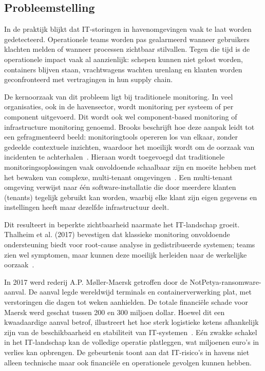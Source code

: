 \subsection{Probleemstelling}

In de praktijk blijkt dat IT-storingen in havenomgevingen vaak te laat worden gedetecteerd. Operationele teams worden pas gealarmeerd wanneer gebruikers klachten melden of wanneer processen zichtbaar stilvallen. Tegen die tijd is de operationele impact vaak al aanzienlijk: schepen kunnen niet gelost worden, containers blijven staan, vrachtwagens wachten urenlang en klanten worden geconfronteerd met vertragingen in hun supply chain.

De kernoorzaak van dit probleem ligt bij traditionele monitoring. In veel organisaties, ook in de havensector, wordt monitoring per systeem of per component uitgevoerd. Dit wordt ook wel component-based monitoring of infrastructure monitoring genoemd. Brooks beschrijft hoe deze aanpak leidt tot een gefragmenteerd beeld: monitoringtools opereren los van elkaar, zonder gedeelde contextuele inzichten, waardoor het moeilijk wordt om de oorzaak van incidenten te achterhalen~\autocite{Brooks2004}. Hieraan wordt toegevoegd dat traditionele monitoringsoplossingen vaak onvoldoende schaalbaar zijn en moeite hebben met het bewaken van complexe, multi-tenant omgevingen~\autocite{Andreolini2014}. Een multi-tenant omgeving verwijst naar één software-installatie die door meerdere klanten (tenants) tegelijk gebruikt kan worden, waarbij elke klant zijn eigen gegevens en instellingen heeft maar dezelfde infrastructuur deelt.

Dit resulteert in beperkte zichtbaarheid naarmate het IT-landschap groeit. Thalheim et al. (2017) bevestigen dat klassieke monitoring onvoldoende ondersteuning biedt voor root-cause analyse in gedistribueerde systemen; teams zien wel symptomen, maar kunnen deze moeilijk herleiden naar de werkelijke oorzaak~\autocite{Thalheim2017}.

In 2017 werd rederij A.P. Møller-Maersk getroffen door de NotPetya-ransomware-aanval. De aanval legde wereldwijd terminals en containerverwerking plat, met verstoringen die dagen tot weken aanhielden. De totale financiële schade voor Maersk werd geschat tussen 200 en 300 miljoen dollar. Hoewel dit een kwaadaardige aanval betrof, illustreert het hoe sterk logistieke ketens afhankelijk zijn van de beschikbaarheid en stabiliteit van IT-systemen~\autocite{Mathews2017}. Eén zwakke schakel in het IT-landschap kan de volledige operatie platleggen, wat miljoenen euro's in verlies kan opbrengen. De gebeurtenis toont aan dat IT-risico's in havens niet alleen technische maar ook financiële en operationele gevolgen kunnen hebben.

